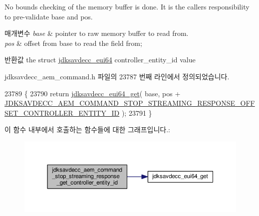 No bounds checking of the memory buffer is done. It is the caller\textquotesingle{}s responsibility to pre-\/validate base and pos.


\begin{DoxyParams}{매개변수}
{\em base} & pointer to raw memory buffer to read from. \\
\hline
{\em pos} & offset from base to read the field from; \\
\hline
\end{DoxyParams}
\begin{DoxyReturn}{반환값}
the struct \hyperlink{structjdksavdecc__eui64}{jdksavdecc\+\_\+eui64} controller\+\_\+entity\+\_\+id value 
\end{DoxyReturn}


jdksavdecc\+\_\+aem\+\_\+command.\+h 파일의 23787 번째 라인에서 정의되었습니다.


\begin{DoxyCode}
23789 \{
23790     \textcolor{keywordflow}{return} \hyperlink{group__eui64_ga2652311a25a6b91cddbed75c108c7031}{jdksavdecc\_eui64\_get}( base, pos + 
      \hyperlink{group__command__stop__streaming__response_ga80d8eaae9062b77861cc54cb7210fc77}{JDKSAVDECC\_AEM\_COMMAND\_STOP\_STREAMING\_RESPONSE\_OFFSET\_CONTROLLER\_ENTITY\_ID}
       );
23791 \}
\end{DoxyCode}


이 함수 내부에서 호출하는 함수들에 대한 그래프입니다.\+:
\nopagebreak
\begin{figure}[H]
\begin{center}
\leavevmode
\includegraphics[width=350pt]{group__command__stop__streaming__response_ga034c12a5cb127aa22e3b3d8e4e221e33_cgraph}
\end{center}
\end{figure}



